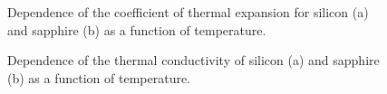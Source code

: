 \begin{figure}[h!]
\begin{center}
\caption{Dependence of the coefficient of thermal expansion for silicon (a) and sapphire (b) as a function of temperature.}
\end{center}
\label{fig:app_alpha}
\end{figure}

\begin{figure}[h!]
\begin{center}
\caption{Dependence of the thermal conductivity of silicon (a) and sapphire (b) as a function of temperature.}
\end{center}
\label{fig:app_kappa}
\end{figure}

